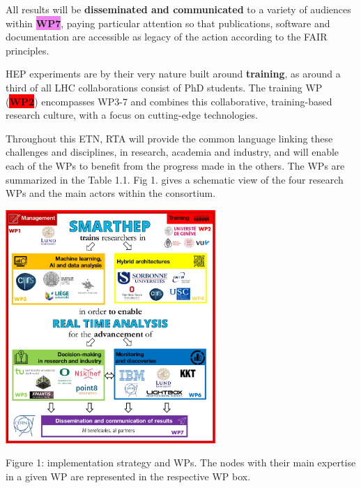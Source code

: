 \vskip-20pt
All results will be \textbf{disseminated and communicated} to a variety of audiences within \textbf{\colorbox{violet}{\color{white}WP7\color{black}}}, paying particular attention so that publications, software and documentation are accessible as legacy of the action according to the FAIR principles. 

HEP experiments are by their very nature built around \textbf{training}, as around a third of all LHC collaborations consist of PhD students. The training WP (\textbf{\colorbox{red}{WP2}}) encompasses WP3-7 and combines this collaborative, training-based research culture, with a focus on cutting-edge technologies. 

Throughout this ETN, RTA will provide the common language linking these challenges and disciplines, in research, academia and industry, and will enable each of the WPs to benefit from the progress made in the others.
The WPs are summarized in the Table 1.1. Fig 1. gives a schematic view of the four research WPs and the main actors within the consortium. 

\begin{center}
\includegraphics[width=0.6\textwidth]{figs/NetworkCompositionCombinedImplementation} %
\begin{center}\footnotesize \label{fig:implementation}
Figure 1: \acronym implementation strategy and WPs. The nodes with their main expertise in a given WP are represented in the respective WP box.
\end{center}
\normalsize 
\vspace{-2mm}
\end{center}

